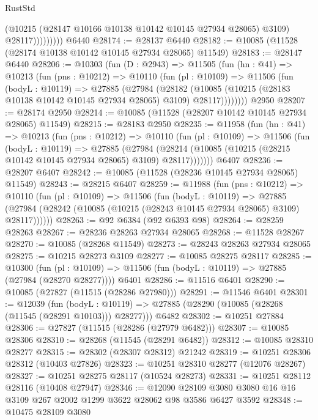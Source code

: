\begin{lexlean}{RustStd}
\begin{coremodule}
                      (@10215 (@28147 @10166 @10138 @10142 @10145 @27934 @28065) @3109)
                      @28117)))))))))
    @6440
@28174 := @28137 @6440
@28182 := @10085 (@11528 (@28174 @10138 @10142 @10145 @27934 @28065) @11549)
@28183 := @28147 @6440
@28206 := @10303
    (fun (D : @2943) =>
    @11505
      (fun (hn : @41) =>
      @10213
        (fun (pns : @10212) =>
        @10110
          (fun (pl : @10109) =>
          @11506
            (fun (bodyL : @10119) =>
            @27885
              (@27984
                (@28182
                  (@10085 (@10215 (@28183 @10138 @10142 @10145 @27934 @28065) @3109) @28117))))))))
    @2950
@28207 := @28174 @2950
@28214 := @10085 (@11528 (@28207 @10142 @10145 @27934 @28065) @11549)
@28215 := @28183 @2950
@28235 := @11958
    (fun (hn : @41) =>
    @10213
      (fun (pns : @10212) =>
      @10110
        (fun (pl : @10109) =>
        @11506
          (fun (bodyL : @10119) =>
          @27885
            (@27984
              (@28214 (@10085 (@10215 (@28215 @10142 @10145 @27934 @28065) @3109) @28117)))))))
    @6407
@28236 := @28207 @6407
@28242 := @10085 (@11528 (@28236 @10145 @27934 @28065) @11549)
@28243 := @28215 @6407
@28259 := @11988
    (fun (pns : @10212) =>
    @10110
      (fun (pl : @10109) =>
      @11506
        (fun (bodyL : @10119) =>
        @27885 (@27984 (@28242 (@10085 (@10215 (@28243 @10145 @27934 @28065) @3109) @28117))))))
@28263 := @92 @6384 (@92 @6393 @98)
@28264 := @28259 @28263
@28267 := @28236 @28263 @27934 @28065
@28268 := @11528 @28267
@28270 := @10085 (@28268 @11549)
@28273 := @28243 @28263 @27934 @28065
@28275 := @10215 @28273 @3109
@28277 := @10085 @28275 @28117
@28285 := @10300
    (fun (pl : @10109) => @11506 (fun (bodyL : @10119) => @27885 (@27984 (@28270 @28277))))
    @6401
@28286 := @11516 @6401
@28290 := @10085 (@27827 (@11515 (@28286 @27980)))
@28291 := @11546 @6401
@28301 := @12039
    (fun (bodyL : @10119) => @27885 (@28290 (@10085 (@28268 (@11545 (@28291 @10103))) @28277)))
    @6482
@28302 := @10251 @27884
@28306 := @27827 (@11515 (@28286 (@27979 @6482)))
@28307 := @10085 @28306
@28310 := @28268 (@11545 (@28291 @6482))
@28312 := @10085 @28310 @28277
@28315 := @28302 (@28307 @28312) @21242
@28319 := @10251 @28306 @28312 (@10403 @27826)
@28323 := @10251 @28310 @28277 (@12076 @28267)
@28327 := @10251 @28275 @28117 (@10524 @28273)
@28331 := @10251 @28112 @28116 (@10408 @27947)
@28346 := @12090
    @28109
    @3080
    @3080
    @16
    @16
    @3109
    @267
    @2002
    @1299
    @3622
    @28062
    @98
    @3586
    @6427
    @3592
@28348 := @10475 @28109 @3080

\end{coremodule}
\end{lexlean}
